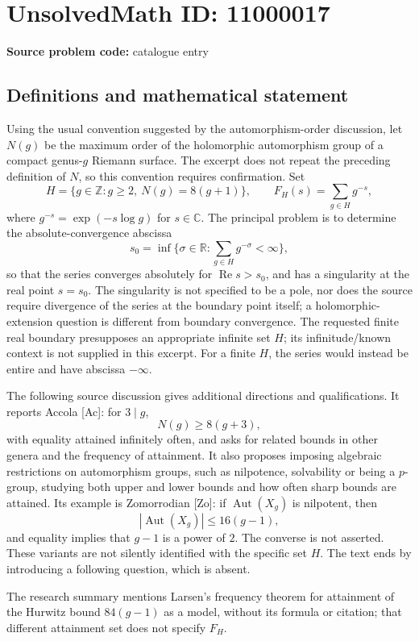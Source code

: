 \documentclass[11pt]{article}
\newcommand{\Z}{\mathbb{Z}}
\newcommand{\R}{\mathbb{R}}
\newcommand{\C}{\mathbb{C}}
\begin{document}
\section*{UnsolvedMath ID: 11000017}
\textbf{Source problem code:} catalogue entry
\subsection{Definitions and mathematical statement}
Using the usual convention suggested by the automorphism-order discussion, let \(N(g)\) be the maximum order of the holomorphic automorphism group of a compact genus-\(g\) Riemann surface. The excerpt does not repeat the preceding definition of \(N\), so this convention requires confirmation. Set
\[H=\{g\in\Z:g\geq2,\ N(g)=8(g+1)\},\qquad
F_H(s)=\sum_{g\in H}g^{-s},\]
where \(g^{-s}=\exp(-s\log g)\) for \(s\in\C\). The principal problem is to determine the absolute-convergence abscissa
\[s_0=\inf\{\sigma\in\R:\sum_{g\in H}g^{-\sigma}<\infty\},\]
so that the series converges absolutely for \(\operatorname{Re}s>s_0\), and has a singularity at the real point \(s=s_0\). The singularity is not specified to be a pole, nor does the source require divergence of the series at the boundary point itself; a holomorphic-extension question is different from boundary convergence. The requested finite real boundary presupposes an appropriate infinite set \(H\); its infinitude/known context is not supplied in this excerpt. For a finite \(H\), the series would instead be entire and have abscissa \(-\infty\).

The following source discussion gives additional directions and qualifications. It reports Accola [Ac]: for \(3\mid g\),
\[N(g)\geq8(g+3),\]
with equality attained infinitely often, and asks for related bounds in other genera and the frequency of attainment. It also proposes imposing algebraic restrictions on automorphism groups, such as nilpotence, solvability or being a \(p\)-group, studying both upper and lower bounds and how often sharp bounds are attained. Its example is Zomorrodian [Zo]: if \(\operatorname{Aut}(X_g)\) is nilpotent, then
\[|\operatorname{Aut}(X_g)|\leq16(g-1),\]
and equality implies that \(g-1\) is a power of \(2\). The converse is not asserted. These variants are not silently identified with the specific set \(H\). The text ends by introducing a following question, which is absent.

The research summary mentions Larsen's frequency theorem for attainment of the Hurwitz bound \(84(g-1)\) as a model, without its formula or citation; that different attainment set does not specify \(F_H\).
\end{document}
